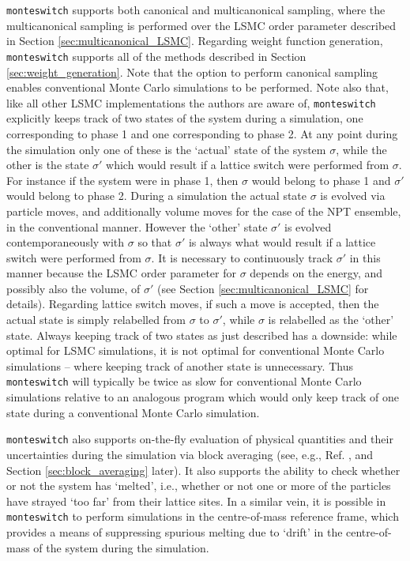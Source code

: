 \documentclass{report}
\begin{document}
\texttt{monteswitch} supports both canonical and multicanonical sampling, where the multicanonical
sampling is performed over the LSMC order parameter described in Section \ref{sec:multicanonical_LSMC}.
Regarding weight function generation, \texttt{monteswitch} supports all of the methods described in Section \ref{sec:weight_generation}. 
Note that the option to perform canonical sampling enables conventional Monte Carlo simulations to be performed. 
Note also that, like all other LSMC implementations the authors are aware of, \texttt{monteswitch} explicitly keeps track of two states of 
the system during a simulation, one corresponding to phase 1 and one corresponding to phase 2. At any point during the simulation only one 
of these is the `actual' state of the system $\sigma$, while the other is the state $\sigma'$ which would result if a lattice switch were
performed from $\sigma$. For instance if the system were in phase 1, then $\sigma$ would belong to phase 1 and $\sigma'$ would belong to 
phase 2. During a simulation the actual state $\sigma$ is evolved via particle moves, and additionally volume moves for the case of the NPT ensemble, 
in the conventional manner. However the `other' state $\sigma'$ is evolved contemporaneously with $\sigma$ so that $\sigma'$ is always what 
would result if a lattice switch were performed from $\sigma$. It is necessary to continuously track $\sigma'$ in this manner because the LSMC order 
parameter for $\sigma$ depends on the energy, and possibly also the volume, of $\sigma'$ (see Section \ref{sec:multicanonical_LSMC} for details). 
Regarding lattice switch moves, if such a move is accepted, then the actual state is simply relabelled from $\sigma$ to $\sigma'$, while $\sigma$ is 
relabelled as the `other' state. Always keeping track of two states as just described has a downside: while optimal for LSMC simulations, 
it is not optimal for conventional Monte Carlo simulations -- where keeping track of another state is unnecessary. Thus \texttt{monteswitch} will 
typically be twice as slow for conventional Monte Carlo simulations relative to an analogous program which would only keep track of one state during 
a conventional Monte Carlo simulation.

\texttt{monteswitch} also supports on-the-fly evaluation of physical quantities and their uncertainties during the simulation via block 
averaging (see, e.g., Ref. \cite{book:Frenkel}, and Section \ref{sec:block_averaging} later). It also supports the ability to check whether or not 
the system has `melted', i.e., whether or not one or more of the particles have strayed `too far' from their lattice sites. In a similar vein, 
it is possible in \texttt{monteswitch} to perform simulations in the centre-of-mass reference frame, which provides a means of suppressing spurious
melting due to `drift' in the centre-of-mass of the system during the simulation.
\end{document}
